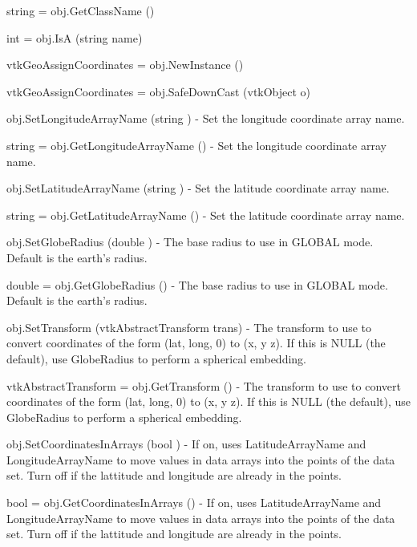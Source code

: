 \begin{DoxyItemize}
\item {\ttfamily string = obj.\-Get\-Class\-Name ()}  
\item {\ttfamily int = obj.\-Is\-A (string name)}  
\item {\ttfamily vtk\-Geo\-Assign\-Coordinates = obj.\-New\-Instance ()}  
\item {\ttfamily vtk\-Geo\-Assign\-Coordinates = obj.\-Safe\-Down\-Cast (vtk\-Object o)}  
\item {\ttfamily obj.\-Set\-Longitude\-Array\-Name (string )} -\/ Set the longitude coordinate array name.  
\item {\ttfamily string = obj.\-Get\-Longitude\-Array\-Name ()} -\/ Set the longitude coordinate array name.  
\item {\ttfamily obj.\-Set\-Latitude\-Array\-Name (string )} -\/ Set the latitude coordinate array name.  
\item {\ttfamily string = obj.\-Get\-Latitude\-Array\-Name ()} -\/ Set the latitude coordinate array name.  
\item {\ttfamily obj.\-Set\-Globe\-Radius (double )} -\/ The base radius to use in G\-L\-O\-B\-A\-L mode. Default is the earth's radius.  
\item {\ttfamily double = obj.\-Get\-Globe\-Radius ()} -\/ The base radius to use in G\-L\-O\-B\-A\-L mode. Default is the earth's radius.  
\item {\ttfamily obj.\-Set\-Transform (vtk\-Abstract\-Transform trans)} -\/ The transform to use to convert coordinates of the form (lat, long, 0) to (x, y z). If this is N\-U\-L\-L (the default), use Globe\-Radius to perform a spherical embedding.  
\item {\ttfamily vtk\-Abstract\-Transform = obj.\-Get\-Transform ()} -\/ The transform to use to convert coordinates of the form (lat, long, 0) to (x, y z). If this is N\-U\-L\-L (the default), use Globe\-Radius to perform a spherical embedding.  
\item {\ttfamily obj.\-Set\-Coordinates\-In\-Arrays (bool )} -\/ If on, uses Latitude\-Array\-Name and Longitude\-Array\-Name to move values in data arrays into the points of the data set. Turn off if the lattitude and longitude are already in the points.  
\item {\ttfamily bool = obj.\-Get\-Coordinates\-In\-Arrays ()} -\/ If on, uses Latitude\-Array\-Name and Longitude\-Array\-Name to move values in data arrays into the points of the data set. Turn off if the lattitude and longitude are already in the points.  

\end{DoxyItemize}
